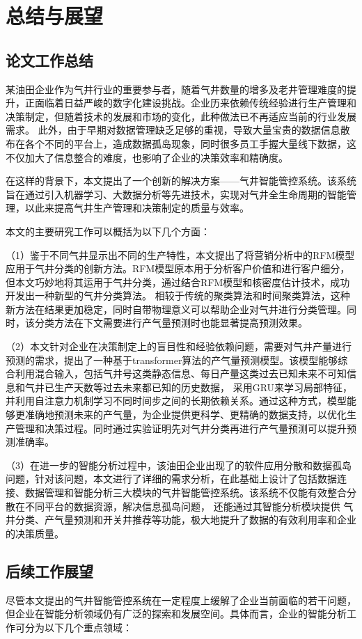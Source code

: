 \chapter{总结与展望}
\section{论文工作总结}
某油田企业作为气井行业的重要参与者，随着气井数量的增多及老井管理难度的提升，正面临着日益严峻的数字化建设挑战。企业历来依赖传统经验进行生产管理和决策制定，但随着技术的发展和市场的变化，此种做法已不再适应当前的行业发展需求。
此外，由于早期对数据管理缺乏足够的重视，导致大量宝贵的数据信息散布在各个不同的平台上，造成数据孤岛现象，同时很多员工手握大量线下数据，这不仅加大了信息整合的难度，也影响了企业的决策效率和精确度。

在这样的背景下，本文提出了一个创新的解决方案——气井智能管控系统。该系统旨在通过引入机器学习、大数据分析等先进技术，实现对气井全生命周期的智能管理，以此来提高气井生产管理和决策制定的质量与效率。

本文的主要研究工作可以概括为以下几个方面：

（1）鉴于不同气井显示出不同的生产特性，本文提出了将营销分析中的RFM模型应用于气井分类的创新方法。RFM模型原本用于分析客户价值和进行客户细分，但本文巧妙地将其运用于气井分类，通过结合RFM模型和核密度估计技术，成功开发出一种新型的气井分类算法。
相较于传统的聚类算法和时间聚类算法，这种新方法在结果更加稳定，同时自带物理意义可以帮助企业对气井进行分类管理。同时，该分类方法在下文需要进行产气量预测时也能显著提高预测效果。

（2）本文针对企业在决策制定上的盲目性和经验依赖问题，需要对气井产量进行预测的需求，提出了一种基于transformer算法的产气量预测模型。该模型能够综合利用混合输入，包括气井号这类静态信息、每日产量这类过去已知未来不可知信息和气井已生产天数等过去未来都已知的历史数据，
采用GRU来学习局部特征，并利用自注意力机制学习不同时间步之间的长期依赖关系。通过这种方式，模型能够更准确地预测未来的产气量，为企业提供更科学、更精确的数据支持，以优化生产管理和决策过程。同时通过实验证明先对气井分类再进行产气量预测可以提升预测准确率。

（3）在进一步的智能分析过程中，该油田企业出现了的软件应用分散和数据孤岛问题，针对该问题，本文进行了详细的需求分析，在此基础上设计了包括数据连接、数据管理和智能分析三大模块的气井智能管控系统。该系统不仅能有效整合分散在不同平台的数据资源，解决信息孤岛问题，
还能通过其智能分析模块提供
气井分类、产气量预测和开关井推荐等功能，极大地提升了数据的有效利用率和企业的决策质量。
\section{后续工作展望}
尽管本文提出的气井智能管控系统在一定程度上缓解了企业当前面临的若干问题，但企业在智能分析领域仍有广泛的探索和发展空间。具体而言，企业的智能分析工作可分为以下几个重点领域：

